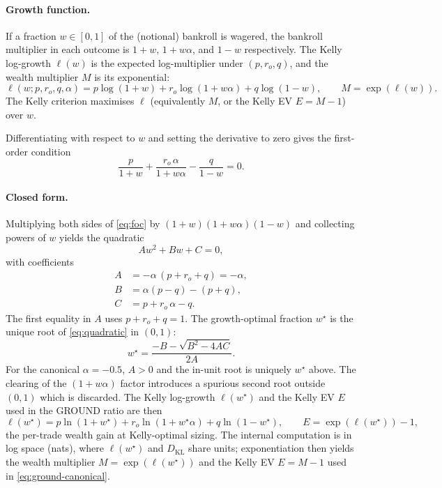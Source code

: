 \documentclass[11pt]{article}
\begin{document}
\paragraph{Growth function.}
If a fraction $w \in [0, 1]$ of the (notional) bankroll is wagered, the
bankroll multiplier in each outcome is $1 + w$, $1 + w\alpha$, and
$1 - w$ respectively. The Kelly log-growth $\ell(w)$ is the expected
log-multiplier under $(p, r_o, q)$, and the wealth multiplier $M$ is
its exponential:
\begin{equation}
\ell(w; p, r_o, q, \alpha)
  = p \log(1 + w) + r_o \log(1 + w\alpha) + q \log(1 - w),
\qquad
M = \exp(\ell(w)).
\label{eq:growth}
\end{equation}
The Kelly criterion maximises $\ell$ (equivalently $M$, or the Kelly EV
$E = M - 1$) over $w$.

Differentiating with respect to $w$ and setting the derivative to zero
gives the first-order condition
\begin{equation}
\frac{p}{1 + w}
+ \frac{r_o\, \alpha}{1 + w \alpha}
- \frac{q}{1 - w} = 0.
\label{eq:foc}
\end{equation}

\paragraph{Closed form.}
Multiplying both sides of \eqref{eq:foc} by $(1+w)(1+w\alpha)(1-w)$ and
collecting powers of $w$ yields the quadratic
\begin{equation}
A w^2 + B w + C = 0,
\label{eq:quadratic}
\end{equation}
with coefficients
\begin{align*}
A &= -\alpha\,(p + r_o + q) = -\alpha, \\
B &= \alpha (p - q) - (p + q), \\
C &= p + r_o\, \alpha - q.
\end{align*}
The first equality in $A$ uses $p + r_o + q = 1$. The growth-optimal
fraction $w^\star$ is the unique root of \eqref{eq:quadratic} in
$(0, 1)$:
\begin{equation}
w^\star = \frac{-B - \sqrt{B^2 - 4AC}}{2A}.
\label{eq:wstar}
\end{equation}
For the canonical $\alpha = -0.5$, $A > 0$ and the in-unit root is
uniquely $w^\star$ above. The clearing of the $(1+w\alpha)$ factor
introduces a spurious second root outside $(0, 1)$ which is discarded.
The Kelly log-growth $\ell(w^\star)$ and the Kelly EV $E$ used in
the GROUND ratio are then
\begin{equation}
\ell(w^\star) = p \ln(1 + w^\star) + r_o \ln(1 + w^\star \alpha)
      + q \ln(1 - w^\star),
\qquad
E = \exp(\ell(w^\star)) - 1,
\label{eq:G-used}
\end{equation}
the per-trade wealth gain at Kelly-optimal sizing. The internal
computation is in log space (nats), where $\ell(w^\star)$ and
$D_{\mathrm{KL}}$ share units; exponentiation then yields the wealth
multiplier $M = \exp(\ell(w^\star))$ and the Kelly EV $E = M - 1$ used
in \eqref{eq:ground-canonical}.
\end{document}
